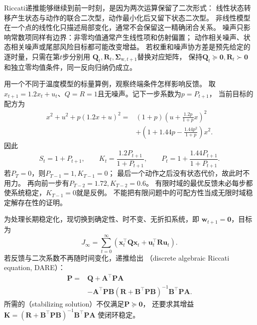 Riccati递推能够继续到前一时刻，是因为两次运算保留了二次形式：
线性状态转移产生状态与动作的联合二次型，动作最小化后又留下状态二次型。
非线性模型在一个点的线性化只描述局部变化，通常不会保留这一精确闭合关系。
噪声只影响常数项同样有边界：非零均值通常产生线性项和仿射偏置；
动作相关噪声、状态相关噪声或尾部风险目标都可能改变增益。
若权重和噪声协方差是预先给定的逐时量，只需在第$t$步分别用
$\bm Q_t,\bm R_t,\bm\Sigma_{\mathrm w,t+1}$替换对应矩阵，
保持$\bm Q_t\succeq\bm0,\bm R_t\succ\bm0$和独立零均值条件，同一反向归纳仍成立。

用一个不同于温度模型的标量算例，观察终端条件怎样影响反馈。
取$x_{t+1}=1.2x_t+u_t$、$Q=R=1$且无噪声。记下一步系数为$p=P_{t+1}$，
当前目标的配方为
\[
  \begin{aligned}
  x^2+u^2+p(1.2x+u)^2
   ={}&(1+p)\left(u+\frac{1.2p}{1+p}x\right)^2\\
     &+\left(1+1.44p-\frac{1.44p^2}{1+p}\right)x^2.
  \end{aligned}
\]
因此
\[
  S_t=1+P_{t+1},\qquad
  K_t=\frac{1.2P_{t+1}}{1+P_{t+1}},
  \qquad
  P_t=1+\frac{1.44P_{t+1}}{1+P_{t+1}}.
\]
若$P_T=0$，则$P_{T-1}=1,K_{T-1}=0$；
最后一个动作之后没有状态代价，故此时不用力。
再向前一步有$P_{T-2}=1.72,K_{T-2}=0.6$。
有限时域的最优反馈未必每步都使系统稳定，$K_{T-1}=0$就是反例。
不能把有限问题中的可配方性当成无限时域稳定解存在性的证明。

为处理长期稳定化，现切换到确定性、时不变、无折扣系统，即
$\bm w_{t+1}=\bm0$，目标为
\[
  J_\infty=\sum_{t=0}^\infty
  (\bm x_t^\top\bm Q\bm x_t+\bm u_t^\top\bm R\bm u_t).
\]
若反馈与二次系数不再随时间变化，递推给出
（discrete algebraic Riccati equation, DARE）：
\begin{equation}
  \begin{aligned}
  \bm P={}&\bm Q+\bm A^\top\bm P\bm A\\
     &-\bm A^\top\bm P\bm B
       (\bm R+\bm B^\top\bm P\bm B)^{-1}\bm B^\top\bm P\bm A.
  \end{aligned}
  \label{eq:control-dare}
\end{equation}
所需的（stabilizing solution）不仅满足$\bm P\succeq\bm0$，
还要求其增益
$\bm K=(\bm R+\bm B^\top\bm P\bm B)^{-1}\bm B^\top\bm P\bm A$
使闭环稳定。

